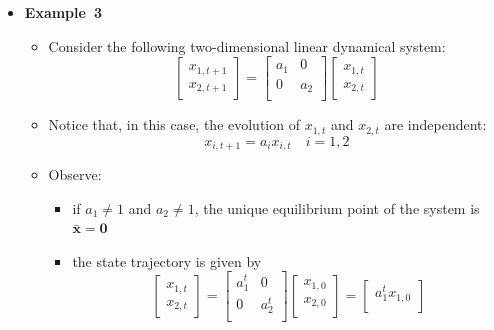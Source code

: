 \documentclass[12pt,a4paper]{article}
\begin{document}
\begin{itemize}
\item \textbf{Example~3}
  \begin{itemize}
  \item Consider the following two-dimensional linear dynamical system:
    \begin{equation}\nonumber%
      \begin{bmatrix}
        x_{1,t+1} \\
        x_{2,t+1}
      \end{bmatrix}
      =
      \begin{bmatrix}
        a_{1} & 0 \\
        0 & a_{2} \\
      \end{bmatrix}
      \begin{bmatrix}
        x_{1,t} \\
        x_{2,t}
      \end{bmatrix}
    \end{equation}
  \item Notice that, in this case, the evolution of
    $x_{1,t}$ and $x_{2,t}$ are independent:
    \begin{equation}\nonumber%
      x_{i,t+1} = a_{i}x_{i,t} \quad i = 1, 2
    \end{equation}
  \item Observe:
    \begin{itemize}
    \item if $a_{1} \neq 1$ and $a_{2} \neq 1$, the unique equilibrium point of the system is
      $\bar{\bm{x}}=\bm{0}$
    \item the state trajectory is given by
      \begin{equation}\nonumber%
      \begin{bmatrix}
        x_{1,t} \\
        x_{2,t}
      \end{bmatrix}
      =
      \begin{bmatrix}
        a_{1}^{t} & 0 \\
        0 & a_{2}^{t} \\
      \end{bmatrix}
      \begin{bmatrix}
        x_{1,0} \\
        x_{2,0} \\
      \end{bmatrix}
      = 
      \begin{bmatrix}
        a_{1}^{t}x_{1,0} \\

\end{bmatrix}
\end{equation}
\end{itemize}
\end{itemize}
\end{itemize}
\end{document}
